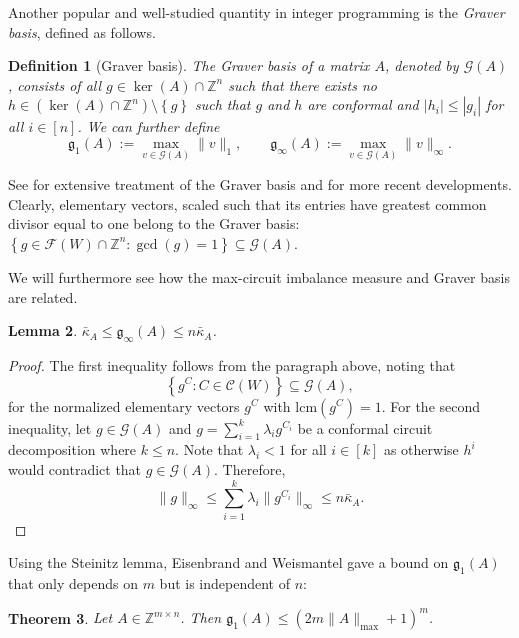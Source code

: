 \documentclass[11pt, a4paper]{article}
\newcommand{\circuits}{\mathcal{C}}
\newcommand{\1}{\mathbbm{1}}
\newcommand{\set}[1]{\left\{ #1 \right\}}
\newcommand{\EE}{\mathcal F}
\newcommand{\lcm}{\mathrm{lcm}}
\newtheorem{theorem}{Theorem}[section]
\newtheorem{Def}[theorem]{Definition}
\newtheorem{lemma}[theorem]{Lemma}
\theoremstyle{case}
\newcommand{\Z}{\mathbb{Z}}
\begin{document}
Another popular and well-studied quantity in integer programming is the \emph{Graver basis}, defined as follows.
\begin{Def}[Graver basis]
The \emph{Graver basis} of a matrix $A$, denoted by $\mathcal{G}(A)$, consists of all $g \in \ker(A) \cap \Z^n$ such that there exists no $h \in (\ker(A) \cap \Z^n)\setminus \set{g}$ such that $g$ and $h$ are conformal and $|h_i| \le |g_i|$ for all $i \in [n]$. 
We can further define  
\begin{equation}
  \mathfrak g_1(A) := \max_{v \in \mathcal{G}(A)} \|v\|_1, \qquad
  \mathfrak g_\infty(A) := \max_{v \in \mathcal{G}(A)} \|v\|_\infty.
\end{equation}
\end{Def}
See \cite{bookDeLoera} for extensive treatment of the Graver basis and \cite{eisenbrand2019algorithmic} for more recent developments.  
Clearly, elementary vectors, scaled such that its entries have greatest common divisor equal to one belong to the Graver basis: $\set{g \in \EE(W) \cap \Z^n: \gcd(g) = 1} \subseteq \mathcal{G}(A)$. 

We will furthermore see how the max-circuit imbalance measure and Graver basis are related.

\begin{lemma} $\bar \kappa_A \le \mathfrak g_\infty(A) \le n\bar\kappa_A$.
\end{lemma}
\begin{proof}
The first inequality follows from the paragraph above, noting that 
  $$\set{g^C : C\in \circuits(W)} \subseteq \mathcal{G}(A),$$
for the normalized elementary vectors $g^C$ with $\lcm(g^C)=1$.
  For the second inequality, let $g \in \mathcal{G}(A)$ and $g = \sum_{i = 1}^k{\lambda_i g^{C_i}}$ be  a conformal circuit decomposition where $k \le n $. Note that $\lambda_i < 1$ for all $i \in [k]$ as otherwise $h^i$ would contradict that $g \in \mathcal{G}(A)$. Therefore, 
  \begin{equation}
    \|g\|_\infty \le \sum_{i = 1}^k \lambda_i \|g^{C_i}\|_\infty \le n \bar \kappa_A. 
  \end{equation} 
\end{proof}

Using the Steinitz lemma, Eisenbrand and Weismantel  \cite[Lemma 2]{eisenbrand2018blockstructure} gave a bound on $\mathfrak g_1(A)$ that only depends on $m$ but is independent of $n$:

\begin{theorem}
  Let $A \in \Z^{m \times n}$. Then $\mathfrak g_1(A) \le (2 m \|A\|_{\max} + 1)^m$.
\end{theorem}
%
\end{document}

